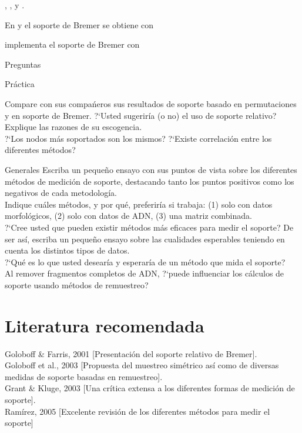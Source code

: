 
\noindent
{}, ,  y .

En  y  el soporte de Bremer se obtiene con 


 implementa el soporte de Bremer con 


{Preguntas}

{Pr\'actica}

\noindent
Compare con sus compa\'neros sus resultados de soporte basado en permutaciones y en soporte de Bremer. ?`Usted sugerir\'ia (o no) el uso de soporte relativo? Explique las razones de su escogencia.\\
?`Los nodos m\'as soportados son los mismos? ?`Existe correlaci\'on entre los diferentes m\'etodos?

{Generales}
\noindent
Escriba un peque\~no ensayo con sus puntos de vista sobre los diferentes m\'etodos de medici\'on de soporte, destacando tanto los puntos positivos como los negativos de cada metodolog\'ia.\\
Indique cu\'ales m\'etodos, y por qu\'e, preferir\'ia si trabaja: (1) solo con datos morfol\'ogicos, (2) solo con datos de ADN, (3) una matriz combinada.\\
?`Cree usted que pueden existir m\'etodos m\'as eficaces para medir el soporte? De ser as\'i, escriba un peque\~no ensayo sobre las cualidades esperables teniendo en cuenta los distintos tipos de datos.\\
?`Qu\'e es lo que usted desear\'ia y esperar\'ia de un m\'etodo que mida el soporte?\\
 Al remover fragmentos completos de ADN, ?`puede influenciar los c\'alculos de soporte usando m\'etodos de remuestreo?


\section*{Literatura recomendada}
\noindent
Goloboff \& Farris, 2001 [Presentaci\'on del soporte relativo de Bremer].\\
Goloboff et al., 2003 [Propuesta del muestreo sim\'etrico as\'i como de diversas medidas de soporte basadas en remuestreo].\\
Grant \& Kluge, 2003 [Una cr\'itica extensa a los diferentes formas de medici\'on de soporte].\\
Ram\'irez, 2005 [Excelente revisi\'on de los diferentes m\'etodos para medir el soporte]
